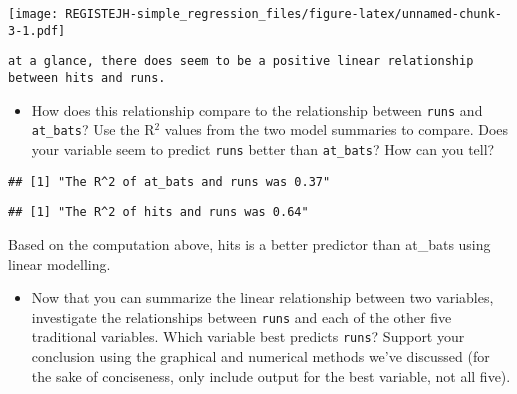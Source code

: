 \documentclass[
]{article}
\newenvironment{Shaded}{\begin{snugshade}}{\end{snugshade}}
\newcommand{\DecValTok}[1]{\textcolor[rgb]{0.00,0.00,0.81}{#1}}
\newcommand{\KeywordTok}[1]{\textcolor[rgb]{0.13,0.29,0.53}{\textbf{#1}}}
\newcommand{\NormalTok}[1]{#1}
\newcommand{\OperatorTok}[1]{\textcolor[rgb]{0.81,0.36,0.00}{\textbf{#1}}}
\newcommand{\StringTok}[1]{\textcolor[rgb]{0.31,0.60,0.02}{#1}}
\providecommand{\tightlist}{%
  \setlength{\itemsep}{0pt}\setlength{\parskip}{0pt}}
\begin{document}
\texttt{[image: REGISTEJH-simple\_regression\_files/figure-latex/unnamed-chunk-3-1.pdf]}

\begin{verbatim}
at a glance, there does seem to be a positive linear relationship between hits and runs.
\end{verbatim}

\begin{itemize}
\tightlist
\item
  How does this relationship compare to the relationship between
  \texttt{runs} and \texttt{at\_bats}? Use the R\(^2\) values from the
  two model summaries to compare. Does your variable seem to predict
  \texttt{runs} better than \texttt{at\_bats}? How can you tell?
\end{itemize}

\begin{Shaded}
\end{Shaded}

\begin{verbatim}
## [1] "The R^2 of at_bats and runs was 0.37"
\end{verbatim}

\begin{Shaded}
\end{Shaded}

\begin{verbatim}
## [1] "The R^2 of hits and runs was 0.64"
\end{verbatim}

Based on the computation above, hits is a better predictor than at\_bats
using linear modelling.

\begin{itemize}
\tightlist
\item
  Now that you can summarize the linear relationship between two
  variables, investigate the relationships between \texttt{runs} and
  each of the other five traditional variables. Which variable best
  predicts \texttt{runs}? Support your conclusion using the graphical
  and numerical methods we've discussed (for the sake of conciseness,
  only include output for the best variable, not all five).
\end{itemize}
\end{document}
